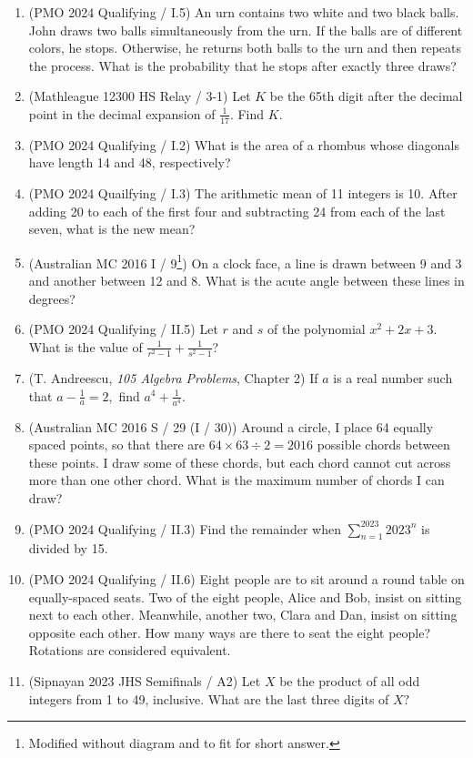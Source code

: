 \documentclass[a4paper]{article}
\begin{document}
\begin{enumerate}
\item (PMO 2024 Qualifying / I.5) An urn contains two white and two black balls. John draws two balls simultaneously from the urn. If the balls are of different colors, he stops. Otherwise, he returns both balls to the urn and then repeats the process. What is the probability that he stops after exactly three draws?
\item (Mathleague 12300 HS Relay / 3-1) Let $K$ be the 65th digit after the decimal point in the decimal expansion of $\frac1{17}$. Find $K$.
\item (PMO 2024 Qualifying / I.2) What is the area of a rhombus whose diagonals have length 14 and 48, respectively?
\item (PMO 2024 Quailfying / I.3) The arithmetic mean of 11 integers is 10. After adding 20 to each of the first four and subtracting 24 from each of the last seven, what is the new mean?
\item (Australian MC 2016 I / 9\footnote{Modified without diagram and to fit for short answer.}) On a clock face, a line is drawn between 9 and 3 and another between 12 and 8. What is the acute angle between these lines in degrees?
\item (PMO 2024 Qualifying / II.5) Let $r$ and $s$ of the polynomial $x^2+2x+3$. What is the value of $\frac1{r^2-1}+\frac1{s^2-1}$?
\item (T. Andreescu, \textit{105 Algebra Problems}, Chapter 2) If $a$ is a real number such that $a-\frac1a=2,$ find $a^4+\frac1{a^4}.$
\item (Australian MC 2016 S / 29 (I / 30)) Around a circle, I place 64 equally spaced points, so that there are $64\times63\div2 = 2016$ possible chords between these points. I draw some of these chords, but each chord cannot cut across more than one other chord. What is the maximum number of chords I can draw?
\item (PMO 2024 Qualifying / II.3) Find the remainder when $\sum^{2023}_{n=1}2023^n$ is divided by 15.
\item (PMO 2024 Qualifying / II.6) Eight people are to sit around a round table on equally-spaced seats. Two of the eight people, Alice and Bob, insist on sitting next to each other. Meanwhile, another two, Clara and Dan, insist on sitting opposite each other. How many ways are there to seat the eight people? Rotations are considered equivalent.
\item (Sipnayan 2023 JHS Semifinals / A2) Let $X$ be the product of all odd integers from 1 to 49, inclusive. What are the last three digits of $X?$

\end{enumerate}
\end{document}

